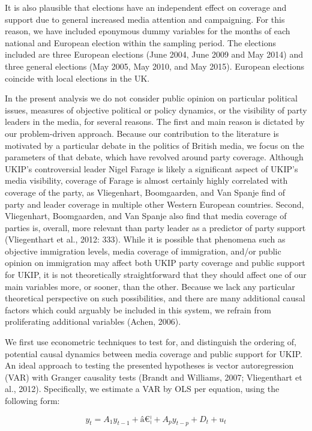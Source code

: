 \documentclass[12pt,article]{article}
\begin{document}
It is also plausible that elections have an independent effect on
coverage and support due to general increased media attention and
campaigning. For this reason, we have included eponymous dummy variables
for the months of each national and European election within the
sampling period. The elections included are three European elections
(June 2004, June 2009 and May 2014) and three general elections (May
2005, May 2010, and May 2015). European elections coincide with local
elections in the UK.

In the present analysis we do not consider public opinion on particular
political issues, measures of objective political or policy dynamics, or
the visibility of party leaders in the media, for several reasons. The
first and main reason is dictated by our problem-driven approach.
Because our contribution to the literature is motivated by a particular
debate in the politics of British media, we focus on the parameters of
that debate, which have revolved around party coverage. Although UKIP's
controversial leader Nigel Farage is likely a significant aspect of
UKIP's media visibility, coverage of Farage is almost certainly highly
correlated with coverage of the party, as Vliegenhart, Boomgaarden, and
Van Spanje find of party and leader coverage in multiple other Western
European countries. Second, Vliegenhart, Boomgaarden, and Van Spanje
also find that media coverage of parties is, overall, more relevant than
party leader as a predictor of party support (Vliegenthart et al., 2012:
333). While it is possible that phenomena such as objective immigration
levels, media coverage of immigration, and/or public opinion on
immigration may affect both UKIP party coverage and public support for
UKIP, it is not theoretically straightforward that they should affect
one of our main variables more, or sooner, than the other. Because we
lack any particular theoretical perspective on such possibilities, and
there are many additional causal factors which could arguably be
included in this system, we refrain from proliferating additional
variables (Achen, 2006).

We first use econometric techniques to test for, and distinguish the
ordering of, potential causal dynamics between media coverage and public
support for UKIP. An ideal approach to testing the presented hypotheses
is vector autoregression (VAR) with Granger causality tests (Brandt and
Williams, 2007; Vliegenthart et al., 2012). Specifically, we estimate a
VAR by OLS per equation, using the following form:

\begin{equation}
 \label{eq:VAR}
    y_t = A_1 y_{t-1} + â¦ + A_p y_{t-p} + D_t + u_t
\end{equation}
\end{document}
